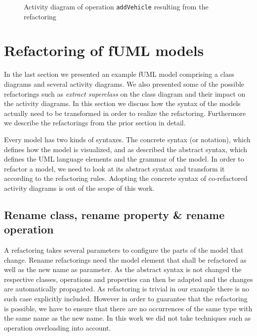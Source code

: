 \documentclass{llncs}
\begin{document}
\begin{figure}[h!t]
 \centering
 \caption{Activity diagram of operation \texttt{addVehicle} resulting from the refactoring}
 \label{fig:addCarRef}
\end{figure}

\section{Refactoring of fUML models}
\label{sec:fuml-refactoring}

In the last section we presented an example fUML model comprising a class diagrams and several activity diagrams. We also presented some of the possible 
refactorings such as \textit{extract superclass} on the class diagram and their impact on the activity diagrams. In this 
section we discuss how the syntax of the models actually need to be transformed in order to realize the refactoring. Furthermore we describe 
the refactorings from the prior section in detail.

Every model has two kinds of syntaxes. The concrete syntax (or notation), which defines how the model is visualized, and as described the abstract
syntax, which defines the UML language elements and the grammar of the model. In order to refactor a model, we need to look 
at its abstract syntax and transform it according to the refactoring rules. Adopting the concrete syntax of co-refactored activity diagrams 
is out of the scope of this work.

\subsection{Rename class, rename property \& rename operation}
\label{sec:renames}
A refactoring takes several parameters to configure the parts of the model that change. Rename 
refactorings need the model element that shall be refactored as well as the new name as parameter. As the abstract syntax 
is not changed the respective classes, operations and properties can then be adapted 
and the changes are automatically propagated. As refactoring is trivial in our example there is no such case explicitly 
included. However in order to guarantee that the 
refactoring is possible, we have to ensure that there are no occurrences of the same type with the same name as the 
new name. In this work we did not take techniques such as operation overloading into account.
\end{document}
